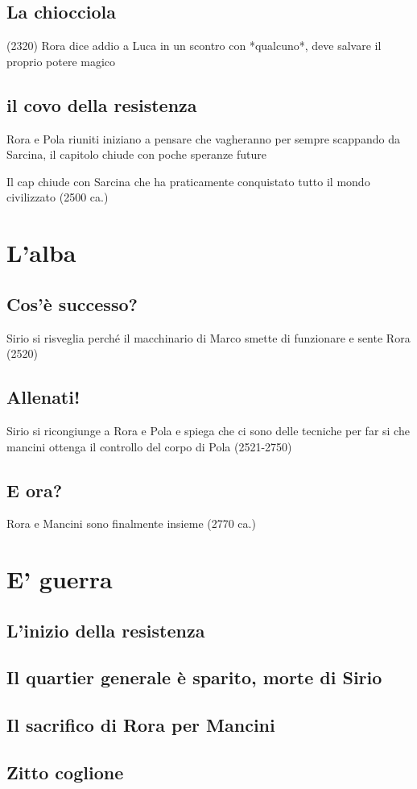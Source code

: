 \documentclass{book}
\begin{document}
\section{La chiocciola}
(2320) Rora dice addio a Luca in un scontro con *qualcuno*, deve salvare il proprio potere magico

\section{il covo della resistenza}
Rora e Pola riuniti iniziano a pensare che vagheranno per sempre scappando da Sarcina, il capitolo chiude con poche speranze future

Il cap chiude con Sarcina che ha praticamente conquistato tutto il mondo civilizzato (2500 ca.)

\chapter{L'alba}
\section{Cos'è successo?}
Sirio si risveglia perché il macchinario di Marco smette di funzionare e sente Rora (2520)

\section{Allenati!}
Sirio si ricongiunge a Rora e Pola e spiega che ci sono delle tecniche per far si che mancini ottenga il controllo del corpo di Pola
(2521-2750)
\section{E ora?}
Rora e Mancini sono finalmente insieme (2770 ca.) 

\chapter{E' guerra}
\section{L'inizio della resistenza}
\section{Il quartier generale è sparito, morte di Sirio}
\section{Il sacrifico di Rora per Mancini}
\section{Zitto coglione}
\end{document}
